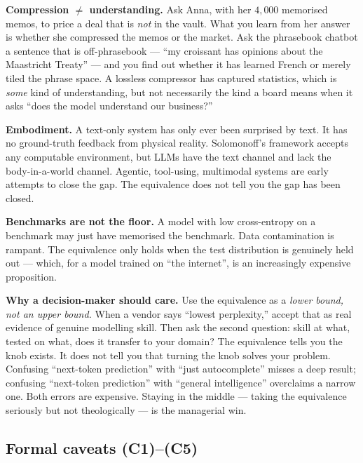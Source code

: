 \begin{intuition}
\medskip

\noindent\textbf{Compression $\ne$ understanding.}
Ask Anna, with her $4{,}000$ memorised memos, to price a deal that
is \emph{not} in the vault. What you learn from her answer is
whether she compressed the memos or the market. Ask the phrasebook
chatbot a sentence that is off-phrasebook --- ``my croissant has
opinions about the Maastricht Treaty'' --- and you find out whether
it has learned French or merely tiled the phrase space. A lossless
compressor has captured statistics, which is \emph{some} kind of
understanding, but not necessarily the kind a board means when it
asks ``does the model understand our business?''

\medskip

\noindent\textbf{Embodiment.}
A text-only system has only ever been surprised by text. It has no
ground-truth feedback from physical reality. Solomonoff's framework
accepts any computable environment, but LLMs have the text channel
and lack the body-in-a-world channel. Agentic, tool-using,
multimodal systems are early attempts to close the gap. The
equivalence does not tell you the gap has been closed.

\medskip

\noindent\textbf{Benchmarks are not the floor.}
A model with low cross-entropy on a benchmark may just have
memorised the benchmark. Data contamination is rampant. The
equivalence only holds when the test distribution is genuinely held
out --- which, for a model trained on ``the internet'', is an
increasingly expensive proposition.

\medskip

\noindent\textbf{Why a decision-maker should care.} Use the
equivalence as a \emph{lower bound, not an upper bound.} When a
vendor says ``lowest perplexity,'' accept that as real evidence of
genuine modelling skill. Then ask the second question: skill at
what, tested on what, does it transfer to your domain? The
equivalence tells you the knob exists. It does not tell you that
turning the knob solves your problem. Confusing ``next-token
prediction'' with ``just autocomplete'' misses a deep result;
confusing ``next-token prediction'' with ``general intelligence''
overclaims a narrow one. Both errors are expensive. Staying in the
middle --- taking the equivalence seriously but not theologically
--- is the managerial win.
\end{intuition}

\subsection*{Formal caveats (C1)--(C5)}
\label{sec:formal-caveats}

